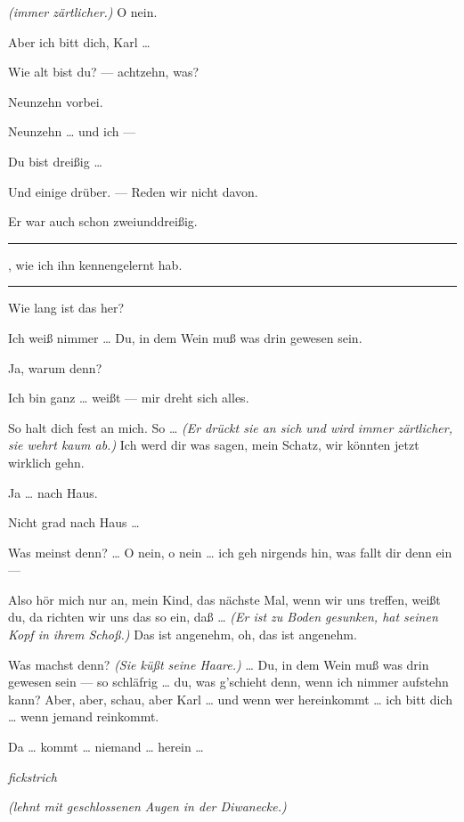 \documentclass[
	final,
	a4paper,
	ngerman,
	mpinclude = true, %
	twoside = true,
	open = right,
	cleardoublepage = plain,
	DIV = 13,
	BCOR = 1cm,
	titlepage = firstiscover,
	]{scrbook}
\newcommand{\direction}[1]{\textit{(#1)}}
\newcommand{\hiat}{%
	\begin{center}
		\tiny
		\raisebox{0.5ex}{\rule{0.3\linewidth}{0.4pt}}
		\textit{fickstrich}
		\raisebox{0.5ex}{\rule{0.3\linewidth}{0.4pt}}
	\end{center}
}
\newenvironment{deletion}{%
		\vspace{0.25\baselineskip}
		\hrule
		\vspace{0.25\baselineskip}
		\color{darkgray}
	}{
		\color{black}
		\vspace{0.25\baselineskip}
		\hrule 
		\vspace{0.25\baselineskip}
	}
\newcommand{\thecharacter}[1]{\textup{\textsc{#1}}\xspace}
\newcommand{\thegatte}{\thecharacter{Gatte}}
\newcommand{\thesuesse}{\thecharacter{Süßes Mädel}}
\newcommand{\character}[1]{\item[#1:]}
\newcommand{\gatte}{\character{\thegatte}}
\newcommand{\suesse}{\character{\thesuesse}}
\begin{document}
\begin{play}
	\gatte
	\direction{immer zärtlicher.} O nein.

	\suesse
	Aber ich bitt dich, Karl \ldots{}

	\gatte
	Wie alt bist du? --- achtzehn, was?

	\suesse
	Neunzehn vorbei.

	\gatte
	Neunzehn \ldots{} und ich ---

	\suesse
	Du bist dreißig \ldots{}

	\gatte
	Und einige drüber. --- Reden wir nicht davon.

	\suesse
	Er war auch schon zweiunddreißig.
	\begin{deletion}
	, wie ich ihn kennengelernt hab.
	\end{deletion}

	\gatte
	Wie lang ist das her?

	\suesse
	Ich weiß nimmer \ldots{} Du, in dem Wein muß was drin gewesen sein.

	\gatte
	Ja, warum denn?

	\suesse
	Ich bin ganz \ldots{} weißt --- mir dreht sich alles.

	\gatte
	So halt dich fest an mich. So \ldots{} \direction{Er drückt sie an sich und wird immer zärtlicher, sie wehrt kaum ab.} Ich werd dir was sagen, mein Schatz, wir könnten jetzt wirklich gehn.

	\suesse
	Ja \ldots{} nach Haus.

	\gatte
	Nicht grad nach Haus \ldots{}

	\suesse
	Was meinst denn? \ldots{} O nein, o nein \ldots{} ich geh nirgends hin, was fallt dir denn ein ---

	\gatte
	Also hör mich nur an, mein Kind, das nächste Mal, wenn wir uns treffen, weißt du, da richten wir uns das so ein, daß \ldots{} \direction{Er ist zu Boden gesunken, hat seinen Kopf in ihrem Schoß.} Das ist angenehm, oh, das ist angenehm.

	\suesse
	Was machst denn? \direction{Sie küßt seine Haare.} \ldots{} Du, in dem Wein muß was drin gewesen sein --- so schläfrig \ldots{} du, was g'schieht denn, wenn ich nimmer aufstehn kann? Aber, aber, schau, aber Karl \ldots{} und wenn wer hereinkommt \ldots{} ich bitt dich \ldots{} wenn jemand reinkommt.

	\gatte
	Da \ldots{} kommt \ldots{} niemand \ldots{} herein \ldots{}

	\hiat

	\suesse
	\direction{lehnt mit geschlossenen Augen in der Diwanecke.}


\end{play}
\end{document}
